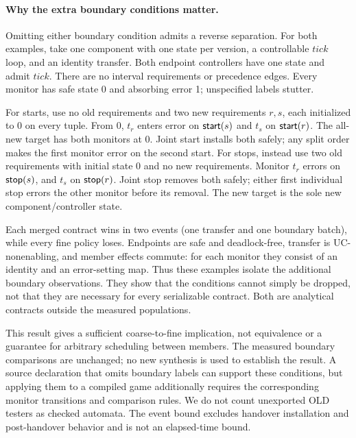 \paragraph{Why the extra boundary conditions matter.}
Omitting either boundary condition admits a reverse separation. For both examples, take one component with one state per version, a controllable $tick$ loop, and an identity transfer. Both endpoint controllers have one state and admit $tick$. There are no interval requirements or precedence edges. Every monitor has safe state 0 and absorbing error 1; unspecified labels stutter.

For starts, use no old requirements and two new requirements $r,s$, each initialized to 0 on every tuple. From 0, $t_r$ enters error on $\mathsf{start}(s)$ and $t_s$ on $\mathsf{start}(r)$. The all-new target has both monitors at 0. Joint start installs both safely; any split order makes the first monitor error on the second start. For stops, instead use two old requirements with initial state 0 and no new requirements. Monitor $t_r$ errors on $\mathsf{stop}(s)$, and $t_s$ on $\mathsf{stop}(r)$. Joint stop removes both safely; either first individual stop errors the other monitor before its removal. The new target is the sole new component/controller state.

Each merged contract wins in two events (one transfer and one boundary batch), while every fine policy loses. Endpoints are safe and deadlock-free, transfer is UC-nonenabling, and member effects commute: for each monitor they consist of an identity and an error-setting map. Thus these examples isolate the additional boundary observations. They show that the conditions cannot simply be dropped, not that they are necessary for every serializable contract. Both are analytical contracts outside the measured populations.

This result gives a sufficient coarse-to-fine implication, not equivalence or a guarantee for arbitrary scheduling between members. The measured boundary comparisons are unchanged; no new synthesis is used to establish the result. A source declaration that omits boundary labels can support these conditions, but applying them to a compiled game additionally requires the corresponding monitor transitions and comparison rules. We do not count unexported OLD testers as checked automata. The event bound excludes handover installation and post-handover behavior and is not an elapsed-time bound.
